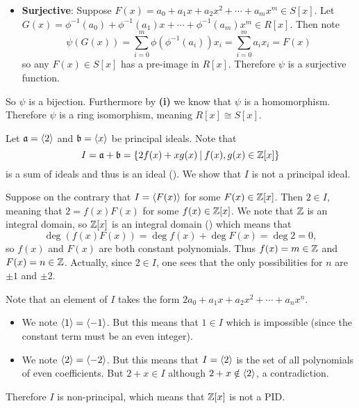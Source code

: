 \begin{questions}
\begin{partquestions}{\roman*}
\begin{itemize}
            \item \textbf{Surjective}: Suppose $F(x) = a_0 + a_1x + a_2x^2 + \cdots + a_mx^m \in S[x]$. Let $G(x) = \phi^{-1}(a_0) + \phi^{-1}(a_1)x + \cdots + \phi^{-1}(a_m)x^m \in R[x]$. Then note
            \[
                \psi(G(x)) = \sum_{i=0}^m\phi(\phi^{-1}(a_i))x_i = \sum_{i=0}^ma_ix_i = F(x)
            \]
            so any $F(x) \in S[x]$ has a pre-image in $R[x]$. Therefore $\psi$ is a surjective function.
        \end{itemize}

        So $\psi$ is a bijection. Furthermore by \textbf{(i)} we know that $\psi$ is a homomorphism. Therefore $\psi$ is a ring isomorphism, meaning $R[x] \cong S[x]$.
    \end{partquestions}

    \item Let $\mathfrak{a} = \left\langle2\right\rangle$ and $\mathfrak{b} = \left\langle x\right\rangle$ be principal ideals. Note that
    \[
        I = \ideal{a} + \ideal{b} = \{2f(x) + xg(x) \vert f(x),g(x) \in \Z[x]\}
    \]
    is a sum of ideals and thus is an ideal (). We show that $I$ is not a principal ideal.

    Suppose on the contrary that $I = \left\langle F(x)\right\rangle$ for some $F(x) \in \mathbb{Z}[x]$. Then $2 \in I$, meaning that $2 = f(x)F(x)$ for some $f(x) \in \mathbb{Z}[x]$. We note that $\mathbb{Z}$ is an integral domain, so $\mathbb{Z}[x]$ is an integral domain () which means that
    \[
        \deg(f(x)F(x)) = \deg f(x) + \deg F(x) = \deg 2 = 0,
    \]
    so $f(x)$ and $F(x)$ are both constant polynomials. Thus $f(x) = m \in \mathbb{Z}$ and $F(x) = n \in \mathbb{Z}$. Actually, since $2 \in I$, one sees that the only possibilities for $n$ are $\pm1$ and $\pm2$.

    Note that an element of $I$ takes the form $2a_0 + a_1x + a_2x^2 + \cdots + a_nx^n$.
    \begin{itemize}
        \item We note $\left\langle1\right\rangle = \left\langle-1\right\rangle$. But this means that $1 \in I$ which is impossible (since the constant term must be an even integer).
        \item We note $\left\langle2\right\rangle = \left\langle-2\right\rangle$. But this means that $I = \left\langle2\right\rangle$ is the set of all polynomials of even coefficients. But $2 + x \in I$ although $2 + x \notin \left\langle2\right\rangle$, a contradiction.
    \end{itemize}

    Therefore $I$ is non-principal, which means that $\mathbb{Z}[x]$ is not a PID.
\end{questions}
